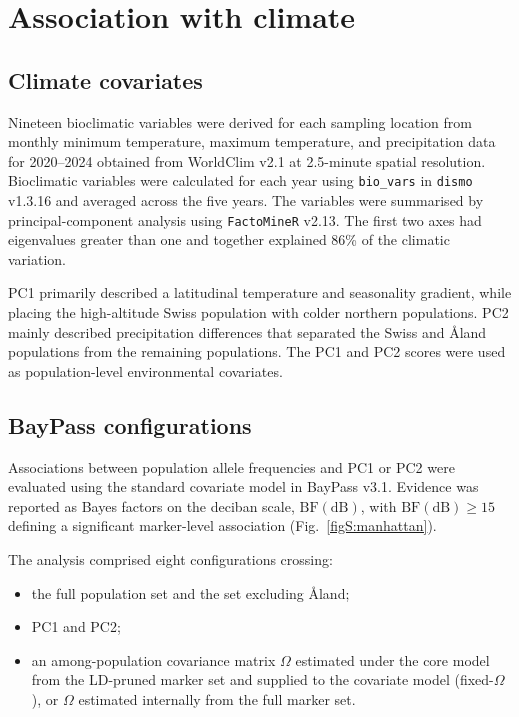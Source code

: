 \documentclass[11pt]{article}
\begin{document}
\section{Association with climate}

\subsection{Climate covariates}

Nineteen bioclimatic variables were derived for each sampling location from
monthly minimum temperature, maximum temperature, and precipitation data for
2020--2024 obtained from WorldClim v2.1 at 2.5-minute spatial resolution.
Bioclimatic variables were calculated for each year using
\texttt{bio\_vars} in \texttt{dismo} v1.3.16 and averaged across the five years.
The variables were summarised by principal-component analysis using
\texttt{FactoMineR} v2.13. The first two axes had eigenvalues greater than one
and together explained 86\% of the climatic variation.

PC1 primarily described a latitudinal temperature and seasonality gradient,
while placing the high-altitude Swiss population with colder northern
populations. PC2 mainly described precipitation differences that separated the
Swiss and \AA{}land populations from the remaining populations. The PC1 and PC2
scores were used as population-level environmental covariates.

\subsection{BayPass configurations}

Associations between population allele frequencies and PC1 or PC2 were
evaluated using the standard covariate model in BayPass v3.1. Evidence was
reported as Bayes factors on the deciban scale, \(\mathrm{BF(dB)}\), with
\(\mathrm{BF(dB)}\geq15\) defining a significant marker-level association
(Fig.~\ref{figS:manhattan}).

The analysis comprised eight configurations crossing:
\begin{itemize}
  \item the full population set and the set excluding \AA{}land;
  \item PC1 and PC2;
  \item an among-population covariance matrix \(\Omega\) estimated under the
        core model from the LD-pruned marker set and supplied to the covariate
        model (fixed-\(\Omega\)), or \(\Omega\) estimated internally from the
        full marker set.
\end{itemize}
\end{document}
